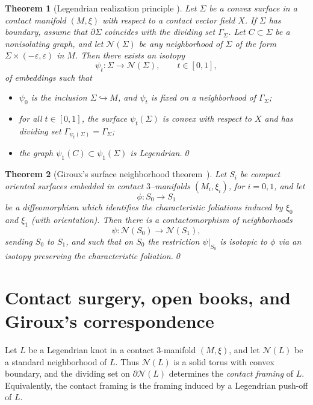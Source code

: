 \documentclass{amsart}
\numberwithin{equation}{section}
\numberwithin{figure}{section}
\newtheorem{theorem}{Theorem}[section]
\theoremstyle{definition}
\theoremstyle{remark}
\let\oldSigma\Sigma
\renewcommand{\Sigma}{\oldSigma}
\let\olddxi\xi %
\renewcommand{\xi}{\olddxi}
\newcommand{\X}{X}
\let\oldgamma\Gamma %
\renewcommand{\Gamma}{\oldgamma}
\begin{document}
\begin{theorem}[Legendrian realization principle \cite{Kanda1998,Honda_classification,Etnyre04}]\label{thm:Legendrian_realization}
Let $\Sigma$ be a convex surface in a contact manifold $(M,\xi)$ with respect to a contact vector field $\X$. If $\Sigma$ has boundary, assume that $\partial\Sigma$ coincides with the dividing set $\Gamma_\Sigma$. Let $C\subset\Sigma$ be a nonisolating graph, and let $\mathcal{N}(\Sigma)$ be any neighborhood of $\Sigma$ of the form $\Sigma\times(-\varepsilon,\varepsilon)$ in $M$. Then there exists an isotopy
\[
\psi_t\colon \Sigma \longrightarrow \mathcal{N}(\Sigma),\qquad t\in[0,1],
\]
of embeddings such that
\begin{itemize}
    \item $\psi_0$ is the inclusion $\Sigma\hookrightarrow M$, and $\psi_t$ is fixed on a neighborhood of $\Gamma_\Sigma$;
    \item for all $t\in[0,1]$, the surface $\psi_t(\Sigma)$ is convex with respect to $\X$ and has dividing set $\Gamma_{\psi_t(\Sigma)}=\Gamma_\Sigma$;
    \item the graph $\psi_1(C)\subset \psi_1(\Sigma)$ is Legendrian.\qed
\end{itemize}
\end{theorem}

\begin{theorem}[Giroux's surface neighborhood theorem~\cite{Giroux91}]\label{thm:neigh_thm}
Let $S_i$ be compact oriented surfaces embedded in contact $3$--manifolds $(M_i,\xi_i)$, for $i=0,1$, and let
\[
\phi: S_0 \to S_1
\]
be a diffeomorphism which identifies the characteristic foliations induced by $\xi_0$ and $\xi_1$ (with orientation). Then there is a contactomorphism of neighborhoods
\[
\psi : \mathcal{N}(S_0) \to \mathcal{N}(S_1),
\]
sending $S_0$ to $S_1$, and such that on $S_0$ the restriction $\psi|_{S_0}$ is isotopic to $\phi$ via an isotopy preserving the characteristic foliation.\qed
\end{theorem}

\section{Contact surgery, open books, and Giroux's correspondence}\label{sec:surgery_OB_Giroux}

Let \(L\) be a Legendrian knot in a contact \(3\)-manifold \((M,\xi)\), and let \(\mathcal N(L)\) be a standard neighborhood of \(L\). Thus \(\mathcal N(L)\) is a solid torus with convex boundary, and the dividing set on \(\partial\mathcal N(L)\) determines the \emph{contact framing} of \(L\). Equivalently, the contact framing is the framing induced by a Legendrian push-off of \(L\).
\end{document}
